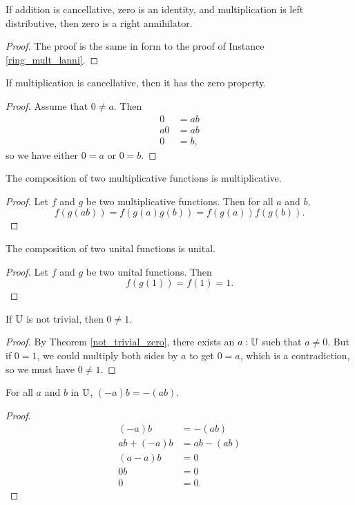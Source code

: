 \documentclass[../../math.tex]{subfiles}
\begin{document}
\begin{instance} \label{ring_mult_ranni}
    If addition is cancellative, zero is an identity, and multiplication is
    left distributive, then zero is a right annihilator.
\end{instance}
\begin{proof}
    The proof is the same in form to the proof of Instance
    \ref{ring_mult_lanni}.
\end{proof}

\begin{instance}
    If multiplication is cancellative, then it has the zero property.
\end{instance}
\begin{proof}
    Assume that $0 \neq a$.  Then
    \begin{align*}
        0 &= ab \\
        a0 &= ab \\
        0 &= b,
    \end{align*}
    so we have either $0 = a$ or $0 = b$.
\end{proof}

\begin{instance}
    The composition of two multiplicative functions is multiplicative.
\end{instance}
\begin{proof}
    Let $f$ and $g$ be two multiplicative functions.  Then for all $a$ and $b$,
    \[
        f(g(ab)) = f(g(a)g(b)) = f(g(a))f(g(b)).
    \]
\end{proof}

\begin{instance}
    The composition of two unital functions is unital.
\end{instance}
\begin{proof}
    Let $f$ and $g$ be two unital functions.  Then
    \[
        f(g(1)) = f(1) = 1.
    \]
\end{proof}

\begin{theorem} \label{not_trivial_one}
    If $\mathbb{U}$ is not trivial, then $0 \neq 1$.
\end{theorem}
\begin{proof}
    By Theorem \ref{not_trivial_zero}, there exists an $a : \mathbb{U}$ such that $a
    \neq 0$.  But if $0 = 1$, we could multiply both sides by $a$ to get $0 =
    a$, which is a contradiction, so we must have $0 \neq 1$.
\end{proof}

\begin{theorem}
    For all $a$ and $b$ in $\mathbb{U}$, $(-a)b = -(ab)$.
\end{theorem}
\begin{proof}
    \begin{align*}
        (-a)b &= -(ab) \\
        ab + (-a)b &= ab - (ab) \\
        (a - a)b &= 0 \\
        0b &= 0 \\
        0 &= 0.
    \end{align*}
\end{proof}
\end{document}
